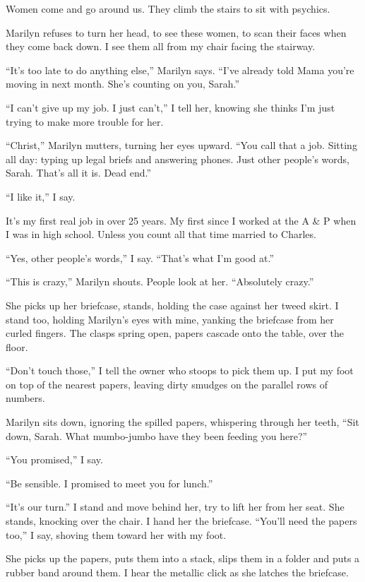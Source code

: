 \documentclass[twoside,10pt]{book}
\begin{document}
Women come and go around us. They climb the stairs to sit with psychics.

Marilyn refuses to turn her head, to see these women, to scan their
faces when they come back down. I see them all from my chair facing the
stairway.

``It's too late to do anything else,'' Marilyn says. ``I've already told
Mama you're moving in next month. She's counting on you, Sarah.''

``I can't give up my job. I just can't,'' I tell her, knowing she thinks
I'm just trying to make more trouble for her.

``Christ,'' Marilyn mutters, turning her eyes upward. ``You call that a
job. Sitting all day: typing up legal briefs and answering phones. Just
other people's words, Sarah. That's all it is. Dead end.''

``I like it,'' I say.

It's my first real job in over 25 years. My first since I worked at the
A \& P when I was in high school. Unless you count all that time married
to Charles.

``Yes, other people's words,'' I say. ``That's what I'm good at.''

``This is crazy,'' Marilyn shouts. People look at her. ``Absolutely
crazy.''

She picks up her briefcase, stands, holding the case against her tweed
skirt. I stand too, holding Marilyn's eyes with mine, yanking the
briefcase from her curled fingers. The clasps spring open, papers
cascade onto the table, over the floor.

``Don't touch those,'' I tell the owner who stoops to pick them up. I
put my foot on top of the nearest papers, leaving dirty smudges on the
parallel rows of numbers.

Marilyn sits down, ignoring the spilled papers, whispering through her
teeth, ``Sit down, Sarah. What mumbo-jumbo have they been feeding you
here?''

``You promised,'' I say.

``Be sensible. I promised to meet you for lunch.''

``It's our turn.'' I stand and move behind her, try to lift her from her
seat. She stands, knocking over the chair. I hand her the briefcase.
``You'll need the papers too,'' I say, shoving them toward her with my
foot.

She picks up the papers, puts them into a stack, slips them in a folder
and puts a rubber band around them. I hear the metallic click as she
latches the briefcase.
\end{document}
